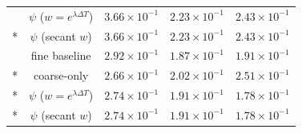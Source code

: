 \begin{longtable}{@{\extracolsep{\fill}}ccccc@{}}
 & $\psi$ ($w=e^{\lambda\Delta T}$) & $3.66\times 10^{-1}$ & $2.23\times 10^{-1}$ & $2.43\times 10^{-1}$\\*
 & $\psi$ (secant $w$) & $3.66\times 10^{-1}$ & $2.23\times 10^{-1}$ & $2.43\times 10^{-1}$\\
\addlinespace[3pt]
\multirow{4}{*}{$128$} & fine baseline & $2.92\times 10^{-1}$ & $1.87\times 10^{-1}$ & $1.91\times 10^{-1}$\\*
 & coarse-only & $2.66\times 10^{-1}$ & $2.02\times 10^{-1}$ & $2.51\times 10^{-1}$\\*
 & $\psi$ ($w=e^{\lambda\Delta T}$) & $2.74\times 10^{-1}$ & $1.91\times 10^{-1}$ & $1.78\times 10^{-1}$\\*
 & $\psi$ (secant $w$) & $2.74\times 10^{-1}$ & $1.91\times 10^{-1}$ & $1.78\times 10^{-1}$\\
\end{longtable}\endgroup
{}\begingroup\small\setlength{\tabcolsep}{1.5pt}\renewcommand{\arraystretch}{1.15}\setlength{\LTleft}{0pt}\setlength{\LTright}{0pt}
